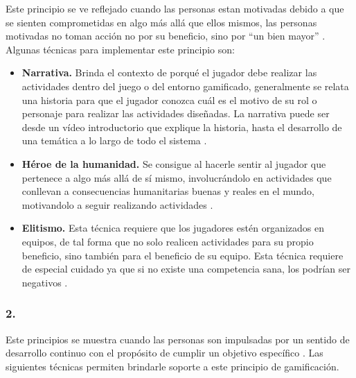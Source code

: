  Este principio se ve reflejado cuando las personas estan motivadas debido a que se
 sienten comprometidas en algo más allá que ellos mismos, las personas motivadas no toman acción
 no por su beneficio, sino por ``un bien mayor'' \cite[p. 66, 69]{Octalysis}. Algunas técnicas
 para implementar este principio son:
    
    \begin{itemize}
    \item
    {\bf Narrativa.}
        Brinda el contexto de porqué el jugador debe realizar las actividades dentro del juego o
        del entorno gamificado, generalmente se relata una historia para que el jugador conozca
        cuál es el motivo de su rol o personaje para realizar las actividades diseñadas.
        La narrativa puede ser desde un vídeo introductorio que explique la historia, hasta
        el desarrollo de una temática a lo largo de todo el sistema \cite[p. 81]{Octalysis}.
        
    \item
    {\bf Héroe de la humanidad.}
        Se consigue al hacerle sentir al jugador que pertenece a algo más allá de sí mismo,
        involucrándolo en actividades que conllevan a consecuencias humanitarias buenas y reales
        en el mundo, motivandolo a seguir realizando actividades \cite[p. 82]{Octalysis}.
        
    \item
    {\bf Elitismo.}
        Esta técnica requiere que los jugadores estén organizados en equipos, de tal forma que
        no solo realicen actividades para su propio beneficio, sino también para el beneficio
        de su equipo. Esta técnica requiere de especial cuidado ya que si no existe una competencia
        sana, los podrían ser negativos \cite[p. 83]{Octalysis}.
    
    \end{itemize}
    
\subsubsection{2. \principioII} \label{subsec:principioII}
 
 Este principios se muestra cuando las personas son impulsadas por un sentido de desarrollo continuo
 con el propósito de cumplir un objetivo específico \cite[p. 91]{Octalysis}. Las siguientes técnicas
 permiten brindarle soporte a este principio de gamificación.
    
